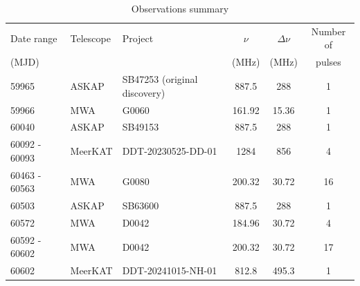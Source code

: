 \documentclass[fleqn,usenatbib]{mnras}
\begin{document}
\begin{table}
  \centering
  \caption{Observations summary}
  \label{tbl:obs}
  \begin{tabular}{lllccc}
    \hline
    Date range & Telescope & Project & $\nu$ & $\Delta\nu$ & Number of \\ 
    (MJD) & & & (MHz) & (MHz) & pulses \\
    \hline 
    59965 & ASKAP & SB47253 (original discovery) & 887.5 & 288 & 1 \\
    59966 & MWA & G0060 & 161.92 & 15.36 & 1 \\
    60040  & ASKAP & SB49153 & 887.5 & 288 & 1 \\
    60092 - 60093 & MeerKAT & DDT-20230525-DD-01 & 1284 & 856 & 4 \\
    60463 - 60563 & MWA & G0080 & 200.32 & 30.72 & 16 \\
    60503 & ASKAP & SB63600 & 887.5 & 288 & 1 \\
    60572 & MWA & D0042 & 184.96 & 30.72 & 4 \\
    60592 - 60602 & MWA & D0042 & 200.32 & 30.72 & 17 \\
    60602 & MeerKAT & DDT-20241015-NH-01 & 812.8 & 495.3 & 1 \\
    \hline
  \end{tabular}
\end{table}
\end{document}
